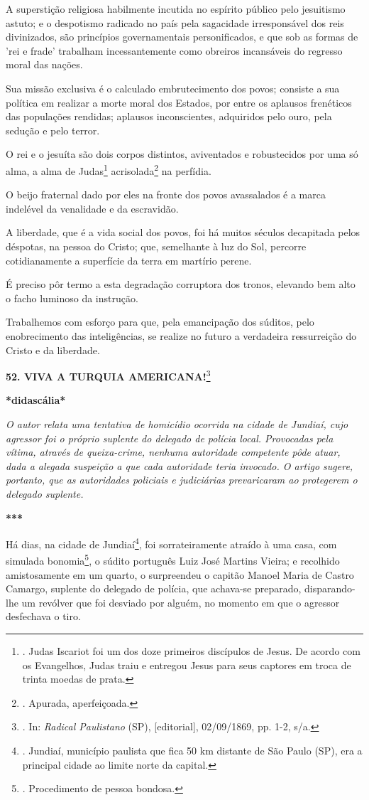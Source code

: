 A superstição religiosa habilmente incutida no espírito público pelo
jesuitismo astuto; e o despotismo radicado no país pela sagacidade
irresponsável dos reis divinizados, são princípios governamentais
personificados, e que sob as formas de 'rei e frade' trabalham
incessantemente como obreiros incansáveis do regresso moral das nações.

Sua missão exclusiva é o calculado embrutecimento dos povos; consiste a
sua política em realizar a morte moral dos Estados, por entre os
aplausos frenéticos das populações rendidas; aplausos inconscientes,
adquiridos pelo ouro, pela sedução e pelo terror.

O rei e o jesuíta são dois corpos distintos, aviventados e robustecidos
por uma só alma, a alma de Judas\footnote{. Judas Iscariot foi um dos
  doze primeiros discípulos de Jesus. De acordo com os Evangelhos, Judas
  traiu e entregou Jesus para seus captores em troca de trinta moedas de
  prata.} acrisolada\footnote{. Apurada, aperfeiçoada.} na perfídia.

O beijo fraternal dado por eles na fronte dos povos avassalados é a
marca indelével da venalidade e da escravidão.

A liberdade, que é a vida social dos povos, foi há muitos séculos
decapitada pelos déspotas, na pessoa do Cristo; que, semelhante à luz do
Sol, percorre cotidianamente a superfície da terra em martírio perene.

É preciso pôr termo a esta degradação corruptora dos tronos, elevando
bem alto o facho luminoso da instrução.

Trabalhemos com esforço para que, pela emancipação dos súditos, pelo
enobrecimento das inteligências, se realize no futuro a verdadeira
ressurreição do Cristo e da liberdade.

\textbf{52. VIVA A TURQUIA AMERICANA!}\footnote{. In: \emph{Radical
  Paulistano} (SP), {[}editorial{]}, 02/09/1869, pp. 1-2, s/a.}

\textbf{*didascália*}

\emph{O autor relata uma tentativa de homicídio ocorrida na cidade de
Jundiaí, cujo agressor foi o próprio suplente do delegado de polícia
local. Provocadas pela vítima, através de queixa-crime, nenhuma
autoridade competente pôde atuar, dada a alegada suspeição a que cada
autoridade teria invocado. O artigo sugere, portanto, que as autoridades
policiais e judiciárias prevaricaram ao protegerem o delegado suplente.}

\textbf{***}

Há dias, na cidade de Jundiaí\footnote{. Jundiaí, município paulista que
  fica 50 km distante de São Paulo (SP), era a principal cidade ao
  limite norte da capital.}, foi sorrateiramente atraído à uma casa, com
simulada bonomia\footnote{. Procedimento de pessoa bondosa.}, o súdito
português Luiz José Martins Vieira; e recolhido amistosamente em um
quarto, o surpreendeu o capitão Manoel Maria de Castro Camargo, suplente
do delegado de polícia, que achava-se preparado, disparando-lhe um
revólver que foi desviado por alguém, no momento em que o agressor
desfechava o tiro.


